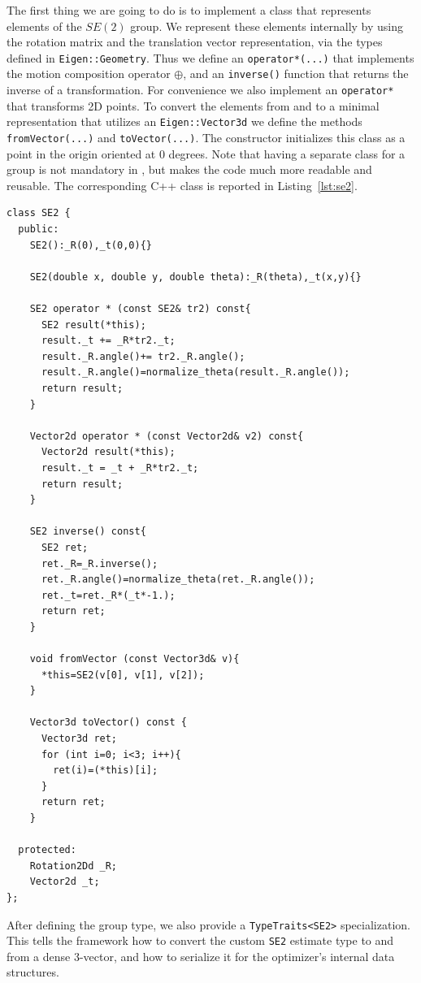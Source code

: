 \documentclass[a4paper]{article}
\begin{document}
The first thing we are going to do is to implement a class that
represents elements of the $SE(2)$ group. We represent these elements
internally by using the rotation matrix and the translation vector
representation, via the types defined in \verb+Eigen::Geometry+.  Thus
we define an \verb+operator*(...)+ that implements the motion composition
operator $\oplus$, and an \verb+inverse()+ function that returns the inverse of
a transformation. For convenience we also implement an
\verb+operator*+ that transforms 2D points. To convert the elements
from and to a minimal representation that utilizes an \verb+Eigen::Vector3d+
we define the methods \verb+fromVector(...)+ and \verb+toVector(...)+.
The constructor initializes this class as a point in the origin
oriented at 0 degrees.  Note that having a separate class for a group
is not mandatory in \gopt, but makes the code much more readable and
reusable. The corresponding C++ class is reported in
Listing~\ref{lst:se2}.
\begin{lstlisting}[float,label=lst:se2,caption=\text{Helper class to represent $SE(2)$}.]
class SE2 {
  public:
    SE2():_R(0),_t(0,0){}

    SE2(double x, double y, double theta):_R(theta),_t(x,y){}

    SE2 operator * (const SE2& tr2) const{
      SE2 result(*this);
      result._t += _R*tr2._t;
      result._R.angle()+= tr2._R.angle();
      result._R.angle()=normalize_theta(result._R.angle());
      return result;
    }

    Vector2d operator * (const Vector2d& v2) const{
      Vector2d result(*this);
      result._t = _t + _R*tr2._t;
      return result;
    }

    SE2 inverse() const{
      SE2 ret;
      ret._R=_R.inverse();
      ret._R.angle()=normalize_theta(ret._R.angle());
      ret._t=ret._R*(_t*-1.);
      return ret;
    }

    void fromVector (const Vector3d& v){
      *this=SE2(v[0], v[1], v[2]);
    }

    Vector3d toVector() const {
      Vector3d ret;
      for (int i=0; i<3; i++){
        ret(i)=(*this)[i];
      }
      return ret;
    }

  protected:
    Rotation2Dd _R;
    Vector2d _t;
};
\end{lstlisting}

After defining the group type, we also provide a \verb+TypeTraits<SE2>+
specialization. This tells the framework how to convert the custom
\verb+SE2+ estimate type to and from a dense 3-vector, and how to
serialize it for the optimizer's internal data structures.
\end{document}
